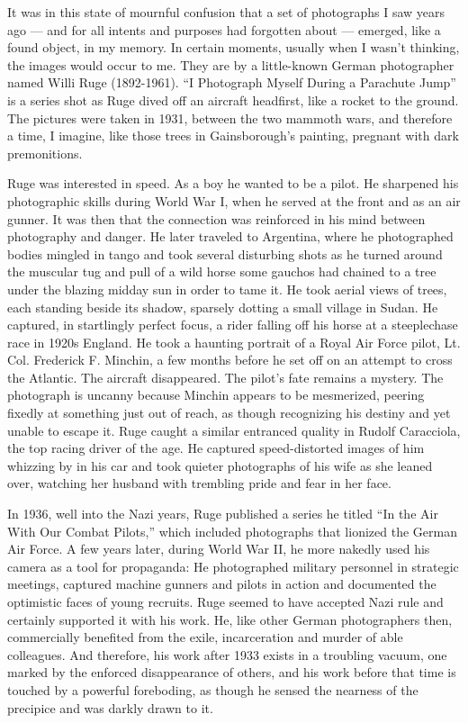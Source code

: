 It was in this state of mournful confusion that a set of photographs I
saw years ago --- and for all intents and purposes had forgotten about
--- emerged, like a found object, in my memory. In certain moments,
usually when I wasn't thinking, the images would occur to me. They are
by a little-known German photographer named Willi Ruge (1892-1961). ``I
Photograph Myself During a Parachute Jump'' is a series shot as Ruge
dived off an aircraft headfirst, like a rocket to the ground. The
pictures were taken in 1931, between the two mammoth wars, and therefore
a time, I imagine, like those trees in Gainsborough's painting, pregnant
with dark premonitions.

Ruge was interested in speed. As a boy he wanted to be a pilot. He
sharpened his photographic skills during World War I, when he served at
the front and as an air gunner. It was then that the connection was
reinforced in his mind between photography and danger. He later traveled
to Argentina, where he photographed bodies mingled in tango and took
several disturbing shots as he turned around the muscular tug and pull
of a wild horse some gauchos had chained to a tree under the blazing
midday sun in order to tame it. He took aerial views of trees, each
standing beside its shadow, sparsely dotting a small village in Sudan.
He captured, in startlingly perfect focus, a rider falling off his horse
at a steeplechase race in 1920s England. He took a haunting portrait of
a Royal Air Force pilot, Lt. Col. Frederick F. Minchin, a few months
before he set off on an attempt to cross the Atlantic. The aircraft
disappeared. The pilot's fate remains a mystery. The photograph is
uncanny because Minchin appears to be mesmerized, peering fixedly at
something just out of reach, as though recognizing his destiny and yet
unable to escape it. Ruge caught a similar entranced quality in Rudolf
Caracciola, the top racing driver of the age. He captured
speed-distorted images of him whizzing by in his car and took quieter
photographs of his wife as she leaned over, watching her husband with
trembling pride and fear in her face.

In 1936, well into the Nazi years, Ruge published a series he titled
``In the Air With Our Combat Pilots,'' which included photographs that
lionized the German Air Force. A few years later, during World War II,
he more nakedly used his camera as a tool for propaganda: He
photographed military personnel in strategic meetings, captured machine
gunners and pilots in action and documented the optimistic faces of
young recruits. Ruge seemed to have accepted Nazi rule and certainly
supported it with his work. He, like other German photographers then,
commercially benefited from the exile, incarceration and murder of able
colleagues. And therefore, his work after 1933 exists in a troubling
vacuum, one marked by the enforced disappearance of others, and his work
before that time is touched by a powerful foreboding, as though he
sensed the nearness of the precipice and was darkly drawn to it.

